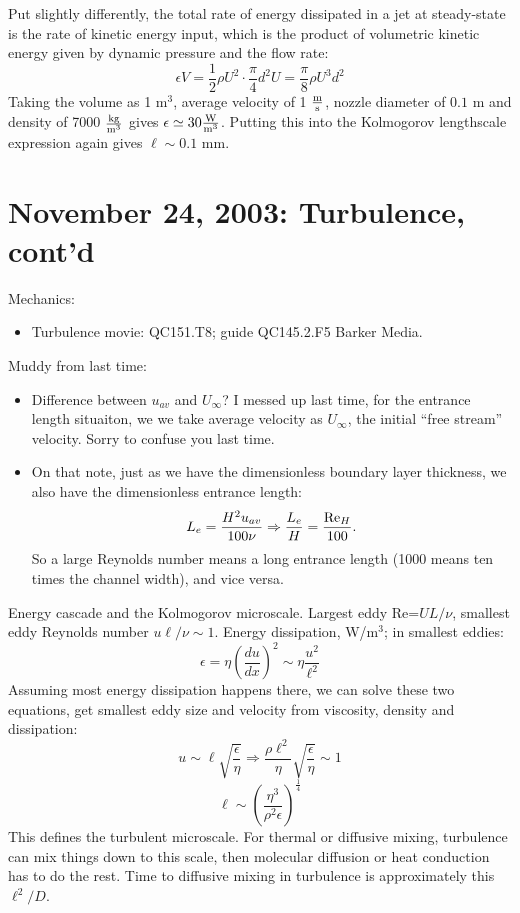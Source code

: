 \documentclass{report}
\begin{document}
Put slightly differently, the total rate of energy dissipated in a jet at
steady-state is the rate of kinetic energy input, which is the product of
volumetric kinetic energy given by dynamic pressure and the flow rate:
$$\epsilon V=\frac{1}{2}\rho U^2\cdot\frac{\pi}{4}d^2U= \frac{\pi}{8}\rho
U^3d^2$$
Taking the volume as 1 m$^3$, average velocity of 1 $\rm\frac{m}{s}$, nozzle
diameter of $0.1$ m and density of 7000 $\rm\frac{kg}{m^3}$ gives
$\rm\epsilon\simeq30\frac{W}{m^3}$.  Putting this into the Kolmogorov
lengthscale expression again gives $\ell\sim0.1$ mm.
\newpage


\section{November 24, 2003: Turbulence, cont'd}

Mechanics:
\begin{itemize}
\item Turbulence movie: QC151.T8; guide QC145.2.F5 Barker Media.
\end{itemize}

\noindent Muddy from last time:
\begin{itemize}
\item Difference between $u_{av}$ and $U_\infty$?  I messed up last time, for
  the entrance length situaiton, we we take average velocity as $U_\infty$, the
  initial ``free stream'' velocity.  Sorry to confuse you last time.
\item On that note, just as we have the dimensionless boundary layer thickness,
  we also have the dimensionless entrance length:
  $$L_e=\frac{H^2u_{av}}{100\nu} \Rightarrow
  \frac{L_e}{H}=\frac{{\rm Re}_H}{100}.$$
  So a large Reynolds number means a long entrance length (1000 means ten times
  the channel width), and vice versa.
\end{itemize}

Energy cascade and the Kolmogorov microscale.  Largest eddy Re=$UL/\nu$,
smallest eddy Reynolds number $u\ell/\nu\sim1$.  Energy dissipation, W/m$^3$;
in smallest eddies:
$$\epsilon = \eta\left(\frac{du}{dx}\right)^2 \sim \eta\frac{u^2}{\ell^2}$$
Assuming most energy dissipation happens there, we can solve these two
equations, get smallest eddy size and velocity from viscosity, density and
dissipation:
$$u\sim\ell\sqrt{\frac{\epsilon}{\eta}} \Rightarrow
\frac{\rho\ell^2}{\eta}\sqrt{\frac{\epsilon}{\eta}}\sim 1$$
$$\ell\sim\left(\frac{\eta^3}{\rho^2\epsilon}\right)^\frac{1}{4}$$
This defines the turbulent microscale.  For thermal or diffusive mixing,
turbulence can mix things down to this scale, then molecular diffusion or heat
conduction has to do the rest.  Time to diffusive mixing in turbulence is
approximately this $\ell^2/D$.
\end{document}
